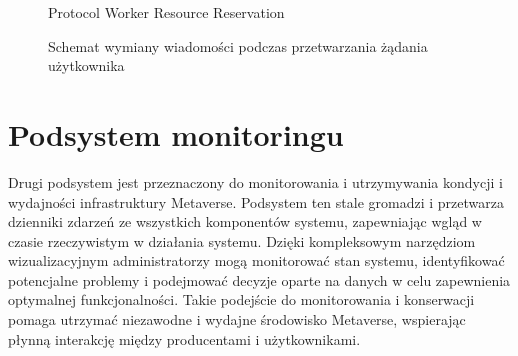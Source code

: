 \begin{figure}[h!]
    \centering
    \begin{msc}[
        title position=center,
        msc keyword=,
        draw frame=none,
        instance distance=2.5cm,
        left environment distance=0.5cm,
        right environment distance=0.5cm,
        label distance=0.3cm,
        title distance=0.5cm
        ]{Protocol Worker Resource Reservation}
            
            \footnotesize
            \nextlevel
            \nextlevel
            \nextlevel
            \nextlevel
            \nextlevel
            \nextlevel
            \nextlevel
            \nextlevel
            \nextlevel
            \nextlevel
            \nextlevel
            \nextlevel
            \nextlevel
            \nextlevel
            \nextlevel
            \nextlevel
            \nextlevel
            \nextlevel
            \nextlevel
            \nextlevel
            \nextlevel
            \nextlevel
            \nextlevel
            \nextlevel
            \nextlevel
        \end{msc}
    \caption{ Schemat wymiany wiadomości podczas przetwarzania żądania użytkownika}
    \label{wymianaWiadomosciWSystemie}
\end{figure}

\section{Podsystem monitoringu}

Drugi podsystem jest przeznaczony do monitorowania i utrzymywania kondycji i wydajności infrastruktury Metaverse. Podsystem ten stale gromadzi i przetwarza dzienniki zdarzeń ze wszystkich komponentów systemu, zapewniając wgląd w czasie rzeczywistym w działania systemu. Dzięki kompleksowym narzędziom wizualizacyjnym administratorzy mogą monitorować stan systemu, identyfikować potencjalne problemy i podejmować decyzje oparte na danych w celu zapewnienia optymalnej funkcjonalności. Takie podejście do monitorowania i konserwacji pomaga utrzymać niezawodne i wydajne środowisko Metaverse, wspierając płynną interakcję między producentami i użytkownikami.